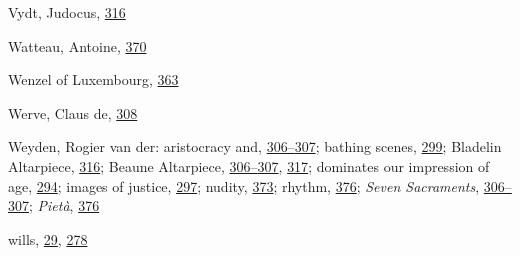 Vydt, Judocus,
\protect\hyperlink{20_ILLUSTRATIONS_FOLLOW_PAGE.xhtmlux5cux23page_316}{316}

Watteau, Antoine,
\protect\hyperlink{21_Chapter_Thirteen__IMAGE_AND_WORD.xhtmlux5cux23page_370}{370}

Wenzel of Luxembourg,
\protect\hyperlink{21_Chapter_Thirteen__IMAGE_AND_WORD.xhtmlux5cux23page_363}{363}

Werve, Claus de,
\protect\hyperlink{20_ILLUSTRATIONS_FOLLOW_PAGE.xhtmlux5cux23page_308}{308}

Weyden, Rogier van der: aristocracy and,
\protect\hyperlink{20_ILLUSTRATIONS_FOLLOW_PAGE.xhtmlux5cux23page_306}{306--}\protect\hyperlink{20_ILLUSTRATIONS_FOLLOW_PAGE.xhtmlux5cux23page_307}{307};
bathing scenes,
\protect\hyperlink{20_ILLUSTRATIONS_FOLLOW_PAGE.xhtmlux5cux23page_299}{299};
Bladelin Altarpiece,
\protect\hyperlink{20_ILLUSTRATIONS_FOLLOW_PAGE.xhtmlux5cux23page_316}{316};
Beaune Altarpiece,
\protect\hyperlink{20_ILLUSTRATIONS_FOLLOW_PAGE.xhtmlux5cux23page_306}{306--}\protect\hyperlink{20_ILLUSTRATIONS_FOLLOW_PAGE.xhtmlux5cux23page_307}{307},
\protect\hyperlink{20_ILLUSTRATIONS_FOLLOW_PAGE.xhtmlux5cux23page_317}{317};
dominates our impression of age,
\protect\hyperlink{19_Chapter_Twelve__ART_IN_LIFE.xhtmlux5cux23page_294}{294};
images of justice,
\protect\hyperlink{19_Chapter_Twelve__ART_IN_LIFE.xhtmlux5cux23page_297}{297};
nudity,
\protect\hyperlink{21_Chapter_Thirteen__IMAGE_AND_WORD.xhtmlux5cux23page_373}{373};
rhythm,
\protect\hyperlink{21_Chapter_Thirteen__IMAGE_AND_WORD.xhtmlux5cux23page_376}{376};
\emph{Seven Sacraments},
\protect\hyperlink{20_ILLUSTRATIONS_FOLLOW_PAGE.xhtmlux5cux23page_306}{306--}\protect\hyperlink{20_ILLUSTRATIONS_FOLLOW_PAGE.xhtmlux5cux23page_307}{307};
\emph{Pietà},
\protect\hyperlink{21_Chapter_Thirteen__IMAGE_AND_WORD.xhtmlux5cux23page_376}{376}

wills,
\protect\hyperlink{08_Chapter_One__THE_PASSIONATE_INTE.xhtmlux5cux23page_29}{29},
\protect\hyperlink{18_Chapter_Eleven__THE_FORMS_OF_THO.xhtmlux5cux23page_278}{278}

